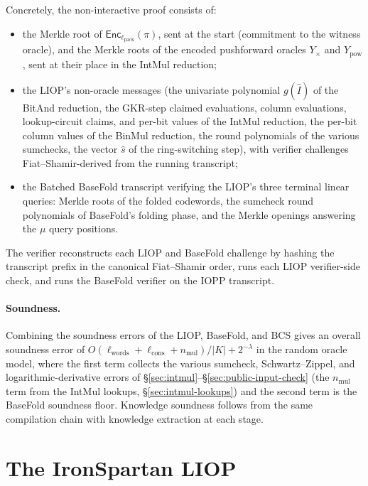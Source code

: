 \documentclass{article}
\theoremstyle{definition}
\begin{document}
Concretely, the non-interactive proof consists of:
\begin{itemize}
\item the Merkle root of $\textsf{Enc}_{\ell_\text{pack}}(\pi)$, sent at the start (commitment to the witness oracle), and the Merkle roots of the encoded pushforward oracles $Y_\times$ and $Y_\text{pow}$, sent at their place in the IntMul reduction;
\item the LIOP's non-oracle messages (the univariate polynomial $g(\widehat{I})$ of the BitAnd reduction, the GKR-step claimed evaluations, column evaluations, lookup-circuit claims, and per-bit values of the IntMul reduction, the per-bit column values of the BinMul reduction, the round polynomials of the various sumchecks, the vector $\hat{s}$ of the ring-switching step), with verifier challenges Fiat--Shamir-derived from the running transcript;
\item the Batched BaseFold transcript verifying the LIOP's three terminal linear queries: Merkle roots of the folded codewords, the sumcheck round polynomials of BaseFold's folding phase, and the Merkle openings answering the $\mu$ query positions.
\end{itemize}

The verifier reconstructs each LIOP and BaseFold challenge by hashing the transcript prefix in the canonical Fiat--Shamir order, runs each LIOP verifier-side check, and runs the BaseFold verifier on the IOPP transcript.

\paragraph{Soundness.}
Combining the soundness errors of the LIOP, BaseFold, and BCS gives an overall soundness error of $O\!\left( \ell_\text{words} + \ell_\text{cons} + n_\text{mul} \right) / |K| + 2^{-\lambda}$ in the random oracle model, where the first term collects the various sumcheck, Schwartz--Zippel, and logarithmic-derivative errors of \S\ref{sec:intmul}--\S\ref{sec:public-input-check} (the $n_\text{mul}$ term from the IntMul lookups, \S\ref{sec:intmul-lookups}) and the second term is the BaseFold soundness floor. Knowledge soundness follows from the same compilation chain with knowledge extraction at each stage.

\section{The IronSpartan LIOP}
\label{sec:ironspartan}
\end{document}

